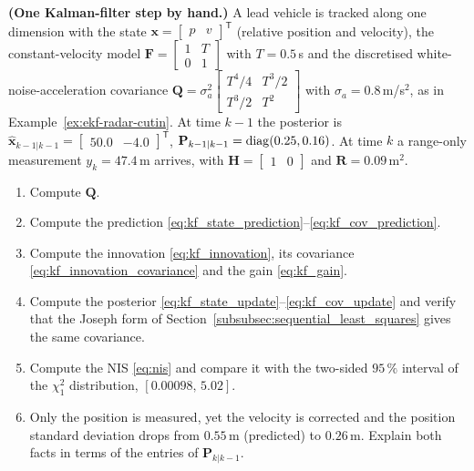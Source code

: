 \begin{prob}\label{prob:ch03:4}
\textbf{(One Kalman-filter step by hand.)} A lead vehicle is tracked along one dimension with the state $\mathbf{x}=\begin{bmatrix}p&v\end{bmatrix}^{\mathsf T}$ (relative position and velocity), the constant-velocity model $\mathbf{F}=\begin{bmatrix}1&T\\0&1\end{bmatrix}$ with $T=0.5$\,s and the discretised white-noise-acceleration covariance $\mathbf{Q}=\sigma_a^{2}\begin{bmatrix}T^{4}/4&T^{3}/2\\T^{3}/2&T^{2}\end{bmatrix}$ with $\sigma_a=0.8$\,m/s$^{2}$, as in Example~\ref{ex:ekf-radar-cutin}. At time $k-1$ the posterior is $\widehat{\mathbf{x}}_{k-1|k-1}=\begin{bmatrix}50.0&-4.0\end{bmatrix}^{\mathsf T}$, $\mathbf{P}_{k-1|k-1}=\operatorname{diag}(0.25,0.16)$. At time $k$ a range-only measurement $y_k=47.4$\,m arrives, with $\mathbf{H}=\begin{bmatrix}1&0\end{bmatrix}$ and $\mathbf{R}=0.09$\,m$^{2}$.
\begin{enumerate}
\item[(a)] Compute $\mathbf{Q}$.
\item[(b)] Compute the prediction \eqref{eq:kf_state_prediction}--\eqref{eq:kf_cov_prediction}.
\item[(c)] Compute the innovation \eqref{eq:kf_innovation}, its covariance \eqref{eq:kf_innovation_covariance} and the gain \eqref{eq:kf_gain}.
\item[(d)] Compute the posterior \eqref{eq:kf_state_update}--\eqref{eq:kf_cov_update} and verify that the Joseph form of Section~\ref{subsubsec:sequential_least_squares} gives the same covariance.
\item[(e)] Compute the NIS \eqref{eq:nis} and compare it with the two-sided $95\,\%$ interval of the $\chi^{2}_{1}$ distribution, $[0.00098,\,5.02]$.
\item[(f)] Only the position is measured, yet the velocity is corrected and the position standard deviation drops from $0.55$\,m (predicted) to $0.26$\,m. Explain both facts in terms of the entries of $\mathbf{P}_{k|k-1}$.
\end{enumerate}
\end{prob}

